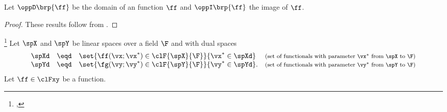 {%
\begin{theorem}
\label{thm:op_DU}
Let $\oppD\brp{\ff}$ be the domain of an function $\ff$ and $\oppI\brp{\ff}$ the image of $\ff$.
\end{theorem}
\begin{proof}
These results follow from .
\end{proof}

\begin{definition}
\label{def:op_conjugate}
\footnote{
  ,
  }
Let $\spX$ and $\spY$ be linear spaces over a field $\F$ and with
dual spaces
  \[\begin{array}{rcl@{\quad}l}
    \spXd &\eqd& \set{\ff(\vx;\vx^\ast)\in\clF{\spX}{\F}}{\vx^\ast\in\spXd}
    & \text{\footnotesize(set of functionals with parameter $\vx^\ast$ from $\spX$ to $\F$)}
    \\
    \spYd &\eqd& \set{\fg(\vy;\vy^\ast)\in\clF{\spY}{\F}}{\vy^\ast\in\spYd}.
    & \text{\footnotesize(set of functionals with parameter $\vy^\ast$ from $\spY$ to $\F$)}
  \end{array}\]
Let $\ff\in\clFxy$ be a function.
\end{definition}

} %




